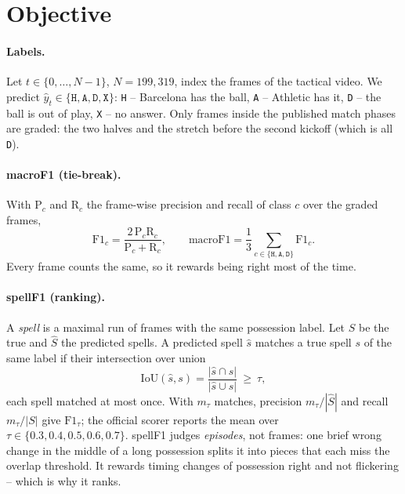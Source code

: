 \documentclass[11pt,a4paper]{article}
\begin{document}
\section{Objective}\label{sec:objective}

\paragraph{Labels.} Let $t\in\{0,\dots,N-1\}$, $N=199{,}319$, index the frames of the tactical
video. We predict $\hat y_t\in\{\texttt{H},\texttt{A},\texttt{D},\texttt{X}\}$: \texttt{H} --
Barcelona has the ball, \texttt{A} -- Athletic has it, \texttt{D} -- the ball is out of play,
\texttt{X} -- no answer. Only frames inside the published match phases are graded: the two
halves and the stretch before the second kickoff (which is all \texttt{D}).

\paragraph{macroF1 (tie-break).} With $\mathrm{P}_c$ and $\mathrm{R}_c$ the frame-wise
precision and recall of class $c$ over the graded frames,
\begin{equation}
  \mathrm{F1}_c = \frac{2\,\mathrm{P}_c\mathrm{R}_c}{\mathrm{P}_c+\mathrm{R}_c},\qquad
  \mathrm{macroF1} = \frac13\sum_{c\in\{\texttt{H},\texttt{A},\texttt{D}\}}\mathrm{F1}_c .
\end{equation}
Every frame counts the same, so it rewards being right most of the time.

\paragraph{spellF1 (ranking).} A \emph{spell} is a maximal run of frames with the same
possession label. Let $S$ be the true and $\hat S$ the predicted spells. A predicted spell
$\hat s$ matches a true spell $s$ of the same label if their intersection over union
\begin{equation}
  \mathrm{IoU}(\hat s,s)=\frac{|\hat s\cap s|}{|\hat s\cup s|}\ \ge\ \tau ,
\end{equation}
each spell matched at most once. With $m_\tau$ matches, precision $m_\tau/|\hat S|$ and recall
$m_\tau/|S|$ give $\mathrm{F1}_\tau$; the official scorer reports the mean over
$\tau\in\{0.3,0.4,0.5,0.6,0.7\}$. spellF1 judges \emph{episodes}, not frames: one brief
wrong change in the middle of a long possession splits it into pieces that each miss the
overlap threshold. It rewards timing changes of possession right and not flickering -- which
is why it ranks.
\end{document}

